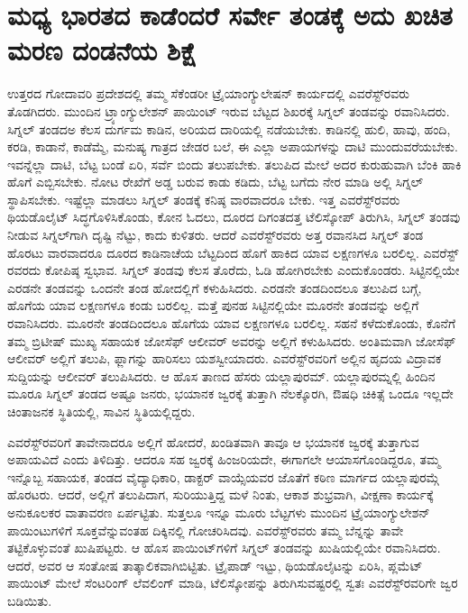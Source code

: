 
\chapter{ಮಧ್ಯ ಭಾರತದ ಕಾಡೆಂದರೆ ಸರ್ವೇ ತಂಡಕ್ಕೆ ಅದು ಖಚಿತ ಮರಣ ದಂಡನೆಯ ಶಿಕ್ಷೆ}

ಉತ್ತರದ ಗೋದಾವರಿ ಪ್ರದೇಶದಲ್ಲಿ ತಮ್ಮ ಸೆಕೆಂಡರೀ ಟ್ರೈಯಾಂಗ್ಯುಲೇಷನ್​ ಕಾರ್ಯದಲ್ಲಿ ಎವರೆಸ್ಟ್​ರವರು ತೊಡಗಿದರು. ಮುಂದಿನ ಟ್ರ್ಯಾಂಗ್ಯುಲೇಶನ್​ ಪಾಯಿಂಟ್​ ಇರುವ ಬೆಟ್ಟದ ಶಿಖರಕ್ಕೆ ಸಿಗ್ನಲ್​ ತಂಡವನ್ನು ರವಾನಿಸಿದರು. ಸಿಗ್ನಲ್​ ತಂಡದಅ ಕೆಲಸ ದುರ್ಗಮ ಕಾಡಿನ, ಅರಿಯದ ದಾರಿಯಲ್ಲಿ ನಡೆಯಬೇಕು. ಕಾಡಿನಲ್ಲಿ ಹುಲಿ, ಹಾವು, ಹಂದಿ, ಕರಡಿ, ಕಾಡಾನೆ, ಕಾಡೆಮ್ಮೆ, ಮನುಷ್ಯ ಗಾತ್ರದ ಜೇಡರ ಬಲೆ, ಈ ಎಲ್ಲಾ ಅಪಾಯಗಳನ್ನು ದಾಟಿ ಮುಂದುವರೆಯಬೇಕು. ಇವನ್ನೆಲ್ಲಾ ದಾಟಿ, ಬೆಟ್ಟ ಬಂಡೆ ಏರಿ, ಸರ್ವೆ ಬಿಂದು ತಲುಪಬೇಕು. ತಲುಪಿದ ಮೇಲೆ ಅದರ ಕುರುಹುವಾಗಿ ಬೆಂಕಿ ಹಾಕಿ ಹೊಗೆ ಎಬ್ಬಿಸಬೇಕು. ನೋಟ ರೇಖೆಗೆ ಅಡ್ಡ ಬರುವ ಕಾಡು ಕಡಿದು, ಬೆಟ್ಟ ಬಗೆದು ನೇರ ಮಾಡಿ ಅಲ್ಲಿ ಸಿಗ್ನಲ್​ ಸ್ಥಾಪಿಸಬೇಕು. ಇಷ್ಟೆಲ್ಲಾ ಮಾಡಲು ಸಿಗ್ನಲ್​ ತಂಡಕ್ಕೆ ಕನಿಷ್ಠ  ವಾರವಾದರೂ ಬೇಕು. ಇತ್ತ ಎವರೆಸ್ಟ್​ರವರು ಥಿಯಡೊಲೈಟ್​ ಸಿದ್ಧಗೊಳಿಸಿಕೊಂಡು, ಕೋನ ಓದಲು, ದೂರದ ದಿಗಂತದತ್ತ ಟೆಲಿಸ್ಕೋಪ್​ ತಿರುಗಿಸಿ, ಸಿಗ್ನಲ್​ ತಂಡವು ನೀಡುವ ಸಿಗ್ನಲ್​ಗಾಗಿ ದೃಷ್ಟಿ ನೆಟ್ಟು, ಕಾದು ಕುಳಿತರು. ಆದರೆ ಎವರೆಸ್ಟ್​ರವರು ಅತ್ತ ರವಾನಸಿದ ಸಿಗ್ನಲ್​ ತಂಡ ಹೊರಟು  ವಾರವಾದರೂ ದೂರದ ಕಾಡಿನಾಚೆಯ ಬೆಟ್ಟದಿಂದ ಹೊಗೆ ಹಾಕಿದ ಯಾವ ಲಕ್ಷಣಗಳೂ ಬರಲಿಲ್ಲ. ಎವರೆಸ್ಟ್​ರವರದು ಕೋಪಿಷ್ಠ ಸ್ವಭಾವ. ಸಿಗ್ನಲ್​ ತಂಡವು ಕೆಲಸ ತೊರೆದು, ಓಡಿ ಹೋಗಿರಬೇಕು ಎಂದುಕೊಂಡರು. ಸಿಟ್ಟಿನಲ್ಲಿಯೇ ಎರಡನೇ ತಂಡವನ್ನು ಒಂದನೇ ತಂಡ ಹೋದಲ್ಲಿಗೆ ಕಳುಹಿಸಿದರು. ಎರಡನೇ ತಂಡದಿಂದಲೂ ತಲುಪಿದ ಬಗ್ಗೆ, ಹೊಗೆಯ ಯಾವ ಲಕ್ಷಣಗಳೂ ಕಂಡು ಬರಲಿಲ್ಲ. ಮತ್ತೆ ಪುನಹ ಸಿಟ್ಟಿನಲ್ಲಿಯೇ ಮೂರನೇ ತಂಡವನ್ನು ಅಲ್ಲಿಗೆ ರವಾನಿಸಿದರು. ಮೂರನೇ ತಂಡದಿಂದಲೂ ಹೊಗೆಯ ಯಾವ ಲಕ್ಷಣಗಳೂ ಬರಲಿಲ್ಲ. ಸಹನೆ ಕಳೆದುಕೊಂಡು, ಕೊನೆಗೆ ತಮ್ಮ ಬ್ರಿಟೀಷ್​ ಮುಖ್ಯ ಸಹಾಯಕ ಜೋಸೆಫ್​ ಆಲೀವರ್​ ಅವರನ್ನು ಅಲ್ಲಿಗೆ ಕಳುಹಿಸಿದರು. ಅಂತಿಮವಾಗಿ ಜೋಸೆಫ್​ ಆಲೀವರ್​ ಅಲ್ಲಿಗೆ ತಲುಪಿ, ಫ್ಲಾಗನ್ನು ಹಾರಿಸಲು ಯಶಸ್ವೀಯಾದರು. ಎವರೆಸ್ಟ್​ರವರಿಗೆ ಅಲ್ಲಿನ ಹೃದಯ ವಿದ್ರಾವಕ ಸುದ್ದಿಯನ್ನು ಆಲೀವರ್​ ತಲುಪಿಸಿದರು. ಆ ಹೊಸ ತಾಣದ ಹೆಸರು ಯಲ್ಲಾಪುರಮ್. ಯಲ್ಲಾಪುರಮ್ನಲ್ಲಿ ಹಿಂದಿನ ಮೂರೂ ಸಿಗ್ನಲ್​ ತಂಡದ ಅಷ್ಟೂ ಜನರು, ಭಯಾನಕ ಜ್ವರಕ್ಕೆ ತುತ್ತಾಗಿ ನೆಲಕ್ಕೊರಗಿ, ಔಷಧಿ ಚಿಕಿತ್ಸೆ ಒಂದೂ ಇಲ್ಲದೇ ಚಿಂತಾಜನಕ ಸ್ಥಿತಿಯಲ್ಲಿ, ಸಾವಿನ ಸ್ಥಿತಿಯಲ್ಲಿದ್ದರು.

ಎವರೆಸ್ಟ್​ರವರಿಗೆ ತಾವೇನಾದರೂ ಅಲ್ಲಿಗೆ ಹೋದರೆ, ಖಂಡಿತವಾಗಿ ತಾವೂ ಆ ಭಯಾನಕ ಜ್ವರಕ್ಕೆ ತುತ್ತಾಗುವ ಅಪಾಯವಿದೆ ಎಂದು ತಿಳಿದಿತ್ತು. ಆದರೂ ಸಹ ಜ್ವರಕ್ಕೆ ಹಿಂಜರಿಯದೇ, ಈಗಾಗಲೇ ಆಯಾಸಗೊಂಡಿದ್ದರೂ, ತಮ್ಮ ಇನ್ನೊಬ್ಬ ಸಹಾಯಕ, ತಂಡದ ವೈದ್ಯಾಧಿಕಾರಿ, ಡಾಕ್ಟರ್​ ವಾಯ್ಸೆಯವರ ಜೊತೆಗೆ ಕಠಿಣ ಮಾರ್ಗದ ಯಲ್ಲಾಪುರಮ್ಗೆ ಹೊರಟರು. ಆದರೆ, ಅಲ್ಲಿಗೆ ತಲುಪಿದಾಗ, ಸುರಿಯುತ್ತಿದ್ದ ಮಳೆ ನಿಂತು, ಆಕಾಶ ಶುಭ್ರವಾಗಿ, ವೀಕ್ಷಣಾ ಕಾರ್ಯಕ್ಕೆ ಅನುಕೂಲಕರ ವಾತಾವರಣ ಏರ್ಪಟ್ಟಿತು. ಸುತ್ತಲೂ ಇನ್ನೂ ಮೂರು ಬೆಟ್ಟಗಳು ಮುಂದಿನ ಟ್ರೈಯಾಂಗ್ಯುಲೇಶನ್​ ಪಾಯಿಂಟುಗಳಿಗೆ ಸೂಕ್ತವೆನ್ನುವಂತಹ ದಿಕ್ಕಿನಲ್ಲಿ ಗೋಚರಿಸಿದವು. ಎವರೆಸ್ಟ್​ರವರು ತಮ್ಮ ಬೆನ್ನನ್ನು ತಾವೇ ತಟ್ಟಿಕೊಳ್ಳುವಂತೆ ಖುಷಿಪಟ್ಟರು. ಆ ಹೊಸ ಪಾಯಿಂಟ್​ಗಳಿಗೆ ಸಿಗ್ನಲ್​ ತಂಡವನ್ನು ಖುಷಿಯಲ್ಲಿಯೇ ರವಾನಿಸಿದರು. ಆದರೆ, ಅವರ ಆ ಸಂತೋಷ ತಾತ್ಕಾಲಿಕವಾಗಿಬಿಟ್ಟಿತು. ಟ್ರೈಪಾಡ್​ ಇಟ್ಟು, ಥಿಯಡೊಲೈಟನ್ನು ಏರಿಸಿ, ಪ್ಲಮೆಟ್​ ಪಾಯಿಂಟ್​ ಮೇಲೆ ಸೆಂಟರಿಂಗ್​ ಲೆವಲಿಂಗ್​ ಮಾಡಿ, ಟೆಲಿಸ್ಕೋಪನ್ನು ತಿರುಗಿಸುವಷ್ಟರಲ್ಲಿ ಸ್ವತಃ ಎವರೆಸ್ಟ್​ರವರಿಗೇ ಜ್ವರ ಬಡಿಯಿತು.

